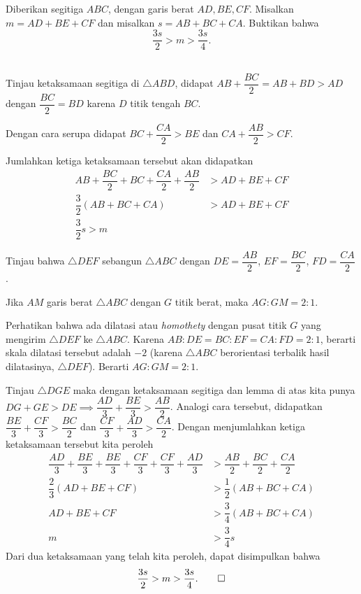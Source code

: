 \documentclass[12pt]{scrartcl}
\begin{document}
	\begin{soalbaru}
		Diberikan segitiga $ABC$, dengan garis berat $AD, BE, CF$. Misalkan $m=AD+BE+CF$ dan misalkan $s=AB+BC+CA$. Buktikan bahwa $$\dfrac{3s}{2} > m > \dfrac{3s}{4}.$$\\[-20pt]
		
		\begin{solusi}
		Tinjau ketaksamaan segitiga di $\triangle ABD$, didapat $AB+\dfrac{BC}{2} = AB+BD > AD$ dengan $\dfrac{BC}{2}=BD$ karena $D$ titik tengah $BC$.
		
		Dengan cara serupa didapat $BC+\dfrac{CA}{2} > BE$ dan $CA + \dfrac{AB}{2}>CF$.
		
		Jumlahkan ketiga ketaksamaan tersebut akan didapatkan 
		\begin{align*}
		AB+\dfrac{BC}{2}+BC+\dfrac{CA}{2}+\dfrac{AB}{2} &> AD+BE+CF\\
		\dfrac{3}{2}\left(AB+BC+CA\right)&> AD+BE+CF\\
		\dfrac{3}{2}s > m
		\end{align*}
		
		Tinjau bahwa $\triangle DEF$ sebangun $\triangle ABC$ dengan $DE = \dfrac{AB}{2}$, $EF=\dfrac{BC}{2}$, $FD=\dfrac{CA}{2}$. 
		
			\begin{lemmarev}
					Jika $AM$ garis berat $\triangle ABC$ dengan $G$ titik berat, maka $AG:GM = 2:1$.
					\begin{buktilemma}
					Perhatikan bahwa ada dilatasi atau \textit{ homothety } dengan pusat titik $G$ yang mengirim $\triangle DEF$ ke $\triangle ABC$. Karena $AB:DE=BC:EF=CA:FD=2:1$, berarti skala dilatasi tersebut adalah $-2$ (karena $\triangle ABC$ berorientasi terbalik hasil dilatasinya, $\triangle DEF$). Berarti $AG:GM=2:1$.
					\end{buktilemma}
				\end{lemmarev}
		
		Tinjau $\triangle DGE$ maka dengan ketaksamaan segitiga dan lemma di atas kita punya $DG + GE > DE \implies \dfrac{AD}{3}+\dfrac{BE}{3}>\dfrac{AB}{2}$. Analogi cara tersebut, didapatkan $\dfrac{BE}{3}+\dfrac{CF}{3}>\dfrac{BC}{2}$ dan $\dfrac{CF}{3}+\dfrac{AD}{3}>\dfrac{CA}{2}$. Dengan menjumlahkan ketiga ketaksamaan tersebut kita peroleh
		\begin{align*}
		\dfrac{AD}{3}+\dfrac{BE}{3}+\dfrac{BE}{3}+\dfrac{CF}{3}+\dfrac{CF}{3}+\dfrac{AD}{3} &> \dfrac{AB}{2}+\dfrac{BC}{2}+\dfrac{CA}{2}\\
		\dfrac{2}{3}\left(AD+BE+CF\right) &> \dfrac{1}{2}\left(AB+BC+CA\right)\\
		AD+BE+CF&> \dfrac{3}{4}\left(AB+BC+CA\right)\\
		m &> \dfrac{3}{4}s
		\end{align*}
		Dari dua ketaksamaan yang telah kita peroleh, dapat disimpulkan bahwa $$\dfrac{3s}{2} > m > \dfrac{3s}{4}.\qed$$ 
		\end{solusi}
	\end{soalbaru}
	
\end{document}
